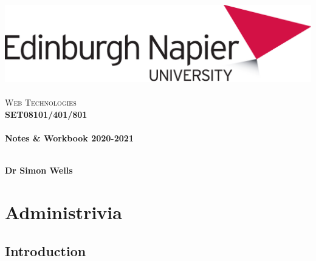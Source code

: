 \documentclass[12pt, a4paper, oneside]{book}
\begin{document}
\frontmatter

\begin{titlepage}
\vspace*{5cm}
\begin{center}
\includegraphics[width=.5\textwidth]{figures/EdNapUniLogoCMYK}~\\[1cm]

\textsc{\Large Web Technologies}\\[1.5cm]

\textsc{\LARGE \bfseries SET08101/401/801 }\\[0.5cm]

\hrulefill \\[0.4cm]
{\huge \bfseries Notes \& Workbook 2020-2021 \\[0.4cm] }
\hrulefill \\[1.5cm]

\begin{minipage}{0.4\textwidth}
\begin{flushleft} \large
\textbf{Dr Simon Wells} \\
\end{flushleft}
\end{minipage}

\vfill

\end{center}
\end{titlepage}


\setcounter{tocdepth}{2}
\cleardoublepage
\tableofcontents
{}

\mainmatter





\chapter{Administrivia}

\section{Introduction}
\label{intro}
\end{document}
